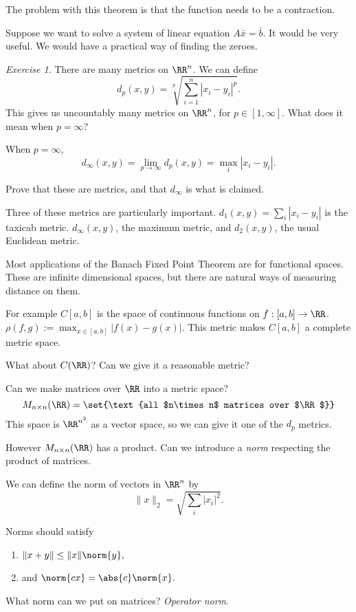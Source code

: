 \documentclass{article}
\theoremstyle{remark}
\newtheorem{exercise}{Exercise}
\begin{document}
The problem with this theorem is that the function needs to 
be a contraction.

Suppose we want to solve a system of linear equation 
$A\bar{x} = \bar{b}$. It would be very useful. We would have 
a practical way of finding the zeroes.

\begin{exercise}
There are many metrics on $\RR^n$. We can define
\[ d_p(x,y) = \sqrt[p]{\sum_{i=1}^n |x_i-y_i|^p}.\]
This gives us uncountably many metrics on $\RR^n$, for
$p\in [1,\infty]$. What does it mean when $p=\infty$?

When $p=\infty$, 
\[ d_\infty(x,y) =\lim_{p\to\infty} d_p(x,y)= \max_i |x_i-y_i|.
\]

Prove that these are metrics, and that $d_\infty$ is what is 
claimed.

Three of these metrics are particularly important. 
$d_1(x,y) = \sum_i |x_i-y_i|$ is the taxicab metric.
$d_\infty(x,y)$, the maximum metric, and 
$d_2(x,y)$, the usual Euclidean metric.
\end{exercise}

Most applications of the Banach Fixed Point Theorem are for
functional spaces. These are infinite dimensional spaces, but
there are natural ways of measuring distance on them.

For example $C[a,b]$ is the space of continuous functions on
$f: [a,b]\to\RR$. $\rho(f,g) := \max_{x\in [a,b]} |f(x)-g(x)|$.
This metric makes $C[a,b]$ a complete metric space.

What about $C(\RR)$? Can we give it a reasonable metric?

Can we make matrices over $\RR$ into a metric space?
\[
    M_{n\times n}(\RR)=\set{\text{all $n\times n$ matrices over $\RR$}}
\]
This space is $\RR^{n^2}$ as a vector space, so we can give it 
one of the $d_p$ metrics.

However $M_{n\times n}(\RR)$ has a product.
Can we introduce a \emph{norm} respecting the product of 
matrices.

We can define the norm of vectors in $\RR^n$ by
\[ \|x\|_2 =\sqrt{\sum_i |x_i|^2}.\]

Norms should satisfy
\begin{enumerate}[1.]
    \item $\|x+y\|\le \|x\|\norm{y},$
    \item and $\norm{cx} = \abs{c}\norm{x}.$
\end{enumerate}

What norm can we put on matrices? \emph{Operator norm}.
\end{document}
